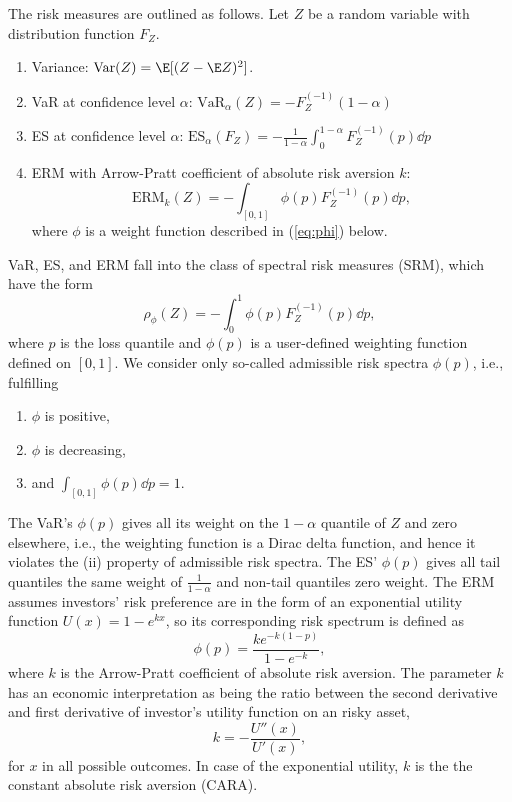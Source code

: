 \documentclass[11pt,a4paper,english]{article}
\begin{document}
The risk measures are outlined as follows.
Let $Z$ be a random
variable with distribution function $F_Z$.
\begin{enumerate}
\item Variance: $\text{Var}(Z) = \E[(Z-\E Z)^2]$. 
\item VaR at confidence level $\alpha$: $\text{VaR}_\alpha(Z) = -F_{Z}^{(-1)}(1-\alpha)$
\item ES at confidence level $\alpha$: $\text{ES}_\alpha(F_Z) = -\frac{1}{1-\alpha}\int_0^{1-\alpha}F_Z^{(-1)}(p)\dd p$
\item ERM with Arrow-Pratt coefficient of absolute risk
  aversion $k$:
  \begin{equation*}
    \text{ERM}_k(Z) = -\int_{[0,1]}\phi(p) F_Z^{(-1)}(p)\dd p,
  \end{equation*}
  where $\phi$ is a weight function described in (\ref{eq:phi}) below.
\end{enumerate}

VaR, ES, and ERM fall into the class of spectral risk measures (SRM),
which have the form \citep{Acerbi2002}%
\begin{equation*}
  \rho_\phi(Z) = - \int_0^1 \phi(p) F_{Z}^{(-1)}(p)\dd p,
\end{equation*}
where $p$ is the loss quantile and $\phi(p)$ is a user-defined
weighting function defined on $[0,1]$.
We consider only so-called admissible risk spectra $\phi(p)$, i.e.,
fulfilling %
\begin{enumerate}[label=(\roman*)]
\item $\phi$ is positive,
\item $\phi$ is decreasing,
\item and $\int_{[0,1]}\phi(p)\dd p=1$. 
\end{enumerate}

The VaR's $\phi(p)$ gives all its weight on the $1-\alpha$ quantile of
$Z$ and zero elsewhere, i.e., the weighting function is a Dirac delta
function, and hence it violates the (ii) property of admissible risk
spectra.  
The ES' $\phi(p)$ gives all tail quantiles the same weight of
$\displaystyle\frac{1}{1-\alpha}$ and non-tail quantiles zero weight. 
The ERM assumes investors' risk preference are in the form of an
exponential utility function $U(x)=1-e^{kx}$, so its corresponding
risk spectrum is defined as
\begin{equation*}
  \phi(p) =\frac{k e^{-k(1-p)}}{1-e^{-k}} , \label{eq:phi}
\end{equation*}
where $k$ is the Arrow-Pratt coefficient of absolute risk aversion. 
The parameter $k$ has an economic interpretation as being the ratio
between the second derivative and first derivative 
of investor's utility function on an risky asset,
\begin{equation*}
  k = -\frac{U''(x)}{U'(x)},
\end{equation*}
for $x$ in all possible outcomes.
In case of the exponential utility, $k$ is the the constant absolute risk aversion (CARA).
\end{document}
